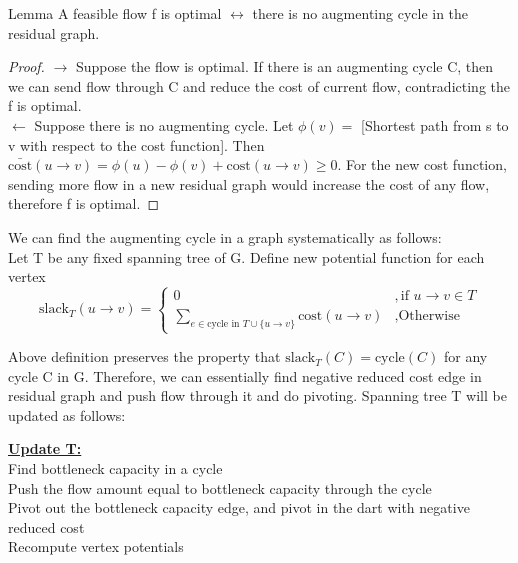 \documentclass{article}
\begin{document}
\begin{oneshot}{Lemma} 
A feasible flow f is optimal $\leftrightarrow$ there is no augmenting cycle in
the residual graph.
\end{oneshot}
\begin{proof}
$\rightarrow$ Suppose the flow is optimal. If there is an augmenting cycle C, 
then we can send flow through C and reduce the cost of current flow, contradicting the f is optimal. \\
$\leftarrow$ Suppose there is no augmenting cycle. Let $\phi(v) = $ 
[Shortest path from s to v with respect to the cost function]. Then 
$\bar{\text{cost}}(u \rightarrow v) = \phi(u) - \phi(v) + \text{cost}(u \rightarrow v) \geq 0$. 
For the new cost function, sending more flow in a new residual graph would 
increase the cost of any flow, therefore f is optimal.
\end{proof}

We can find the augmenting cycle in a graph systematically as follows: \\
Let T be any fixed spanning tree of G. Define new potential function for each vertex
\[ \text{slack}_{T}(u \rightarrow v) = \begin{cases} 0 & ,\mbox{if } u \rightarrow v \in T \\
  \sum \limits_{e \in \text{cycle in } T \cup \{u \rightarrow v\} } 
    \text{cost}(u \rightarrow v) & ,\mbox{Otherwise } \end{cases}\]

Above definition preserves the property that $\text{slack}_T(C) = \text{cycle}(C)$ 
for any cycle C in G. Therefore, we can essentially find negative reduced cost 
edge in residual graph and push flow through it and do pivoting. 
Spanning tree T will be updated as follows: \\

\begin{center}
\begin{algorithm}
\textbf{\underline{Update T:}} \\ \quad
  Find bottleneck capacity in a cycle \\ \quad
  Push the flow amount equal to bottleneck capacity through the cycle \\ \quad
  Pivot out the bottleneck capacity edge, and pivot in the dart with negative reduced cost \\ \quad
  Recompute vertex potentials
\end{algorithm}
\end{center}
\end{document}

